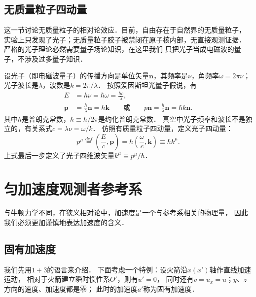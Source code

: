 \subsection{无质量粒子四动量}
这一节讨论无质量粒子的相对论效应．目前，自由存在于自然界的无质量粒子，
实验上只发现了光子；无质量粒子胶子被禁闭在原子核内部，无直接观测证据．
严格的光子理论必然需要量子场论知识，在这里我们
只把光子当成电磁波的量子，不涉及过多量子知识．



设光子（即电磁波量子）的传播方向是单位矢量$\boldsymbol{n}$，其频率是$\nu$，角频率$\omega=2\pi \nu$；
光子波长是$\lambda$，波数是$k=2\pi/\lambda$．
按照爱因斯坦光量子假说，有
\begin{align}
	E &= h \nu = \hbar \omega  = \frac{hc}{\lambda}, \\
	\boldsymbol{p}&=\frac{h}{\lambda}  \boldsymbol{n} = \hbar \boldsymbol{k}
	\qquad\text{或}\qquad p\boldsymbol{n}=\frac{h}{\lambda}  \boldsymbol{n} = \hbar k\boldsymbol{n}.
\end{align}
其中$h$是普朗克常数，$\hbar\equiv h/2\pi$是约化普朗克常数．
真空中光子频率和波长不是独立的，有关系式$c=\lambda \nu=\omega/k$．
仿照有质量粒子四动量，定义{\heiti 光子四动量}：
\begin{equation}\label{chsr:eqn_photon-momentum}
	p^\mu  \overset{def}{=}  \left(\frac{E}{c},\boldsymbol{p}\right)
	=\hbar \left(\frac{\omega}{c},\boldsymbol{k}\right) \equiv \hbar k^\mu.
\end{equation}
上式最后一步定义了光子{\heiti 四维波矢量}$k^\mu \equiv p^\mu/\hbar$．






\section{匀加速度观测者参考系}\label{chsr:sec_yjs}

与牛顿力学不同，在狭义相对论中，加速度是一个与参考系相关的物理量，
因此我们必须更加谨慎地表达加速度的含义．



\subsection{固有加速度}
我们先用$1+3$的语言来介绍．
下面考虑一个特例：设火箭沿$x(x')$轴作直线加速运动，
相对于火箭建立瞬时惯性系$O'$，则有$u'=0$，
同时还有$v=u_x=u$；$y$、$z$方向的速度、加速度都是零；
此时的加速度$a'$称为{\heiti 固有加速度}．

